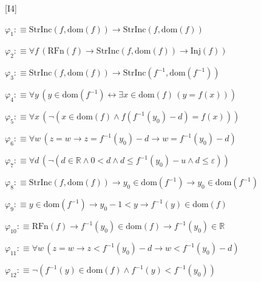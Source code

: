 \begin{fullproof}{[I4]}
\begin{ptree}
\noLine
{}
\noLine
{}
\end{ptree}
\begin{abbrevlist}
\item $\varphi_{1} :\equiv \mathrm{StrInc}(f,\mathrm{dom}(f)) \to \mathrm{StrInc}(f,\mathrm{dom}(f))$
\item $\varphi_{2} :\equiv \forall f\,(\mathrm{RFn}(f) \to \mathrm{StrInc}(f,\mathrm{dom}(f)) \to \mathrm{Inj}(f))$
\item $\varphi_{3} :\equiv \mathrm{StrInc}(f,\mathrm{dom}(f)) \to \mathrm{StrInc}(f^{-1},\mathrm{dom}(f^{-1}))$
\item $\varphi_{4} :\equiv \forall y\,(y \in \mathrm{dom}(f^{-1}) \leftrightarrow \exists x \in \mathrm{dom}(f)\,(y = f(x)))$
\item $\varphi_{5} :\equiv \forall x\,(\neg (x \in \mathrm{dom}(f) \land f(f^{-1}(y_{0}) - d) = f(x)))$
\item $\varphi_{6} :\equiv \forall w\,(z = w \to z = f^{-1}(y_{0}) - d \to w = f^{-1}(y_{0}) - d)$
\item $\varphi_{7} :\equiv \forall d\,(\neg (d \in \mathbb{R} \land 0 < d \land d \leq f^{-1}(y_{0}) - u \land d \leq \varepsilon))$
\item $\varphi_{8} :\equiv \mathrm{StrInc}(f,\mathrm{dom}(f)) \to y_{0} \in \mathrm{dom}(f^{-1}) \to y_{0} \in \mathrm{dom}(f^{-1})$
\item $\varphi_{9} :\equiv y \in \mathrm{dom}(f^{-1}) \to y_{0} - 1 < y \to f^{-1}(y) \in \mathrm{dom}(f)$
\item $\varphi_{10} :\equiv \mathrm{RFn}(f) \to f^{-1}(y_{0}) \in \mathrm{dom}(f) \to f^{-1}(y_{0}) \in \mathbb{R}$
\item $\varphi_{11} :\equiv \forall w\,(z = w \to z < f^{-1}(y_{0}) - d \to w < f^{-1}(y_{0}) - d)$
\item $\varphi_{12} :\equiv \neg (f^{-1}(y) \in \mathrm{dom}(f) \land f^{-1}(y) < f^{-1}(y_{0}))$

\end{abbrevlist}
\end{fullproof}
